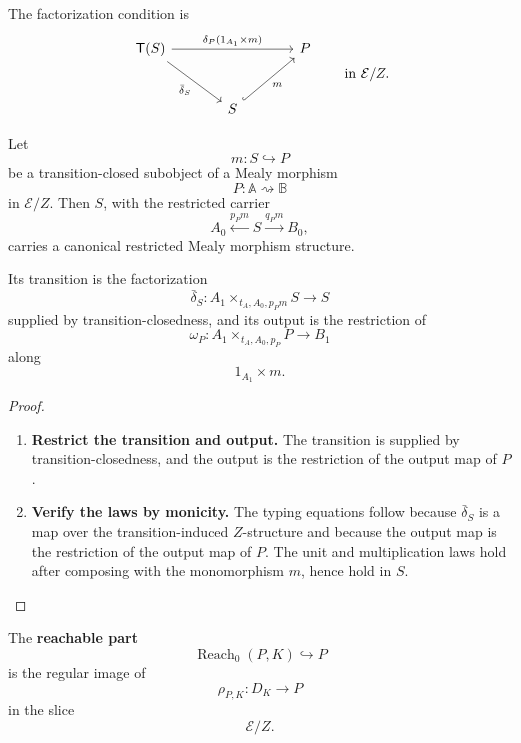 The factorization condition is
\[
    \begin{tikzcd}[column sep=large, row sep=large]
            \mathsf T(S)
                \arrow[rr, "{\delta_P(1_{A_1}\times m)}"]
                \arrow[dr, "\bar\delta_S"']
        &
        &
            P
        \\
        &
            S
                \arrow[ur, hook, "m"']
        &
    \end{tikzcd}
    \qquad
    \text{in }\mathcal E/Z.
\]

\begin{lemma}
\label{lem:restriction-transition-closed-subobject}
    Let
    \[
        m:S\hookrightarrow P
    \]
    be a transition-closed subobject of a Mealy morphism
    \[
        P:\mathbb A\rightsquigarrow\mathbb B
    \]
    in \(\mathcal E/Z\). Then \(S\), with the restricted carrier
    \[
        A_0\xleftarrow{p_Pm}S\xrightarrow{q_Pm}B_0,
    \]
    carries a canonical restricted Mealy morphism structure.

    Its transition is the factorization
    \[
        \bar\delta_S:
        A_1\times_{t_A,A_0,p_Pm}S\to S
    \]
    supplied by transition-closedness, and its output is the restriction of
    \[
        \omega_P:
        A_1\times_{t_A,A_0,p_P}P\to B_1
    \]
    along
    \[
        1_{A_1}\times m.
    \]
\end{lemma}
\begin{proof}
    \leavevmode
    \begin{enumerate}
        \item \textbf{Restrict the transition and output.} The transition is supplied by transition-closedness, and the output is the restriction of the output map of \(P\).

        \item \textbf{Verify the laws by monicity.} The typing equations follow because \(\bar\delta_S\) is a map over the transition-induced \(Z\)-structure and because the output map is the restriction of the output map of \(P\). The unit and multiplication laws hold after composing with the monomorphism \(m\), hence hold in \(S\).
    \end{enumerate}
\end{proof}

\begin{definition}
\label{def:reachable-part}
    The \textbf{reachable part}
    \[
        \operatorname{Reach}_0(P,K)\hookrightarrow P
    \]
    is the regular image of
    \[
        \rho_{P,K}:D_K\to P
    \]
    in the slice
    \[
        \mathcal E/Z.
    \]
\end{definition}

